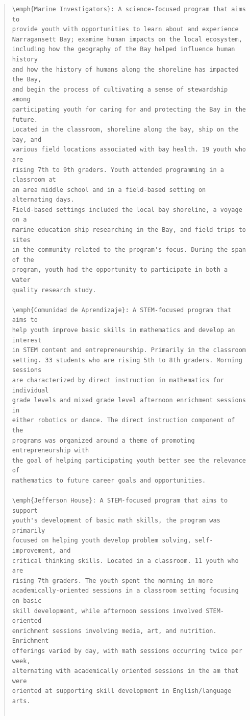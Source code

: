 \documentclass[]{msu-thesis}
\theoremstyle{definition}
\theoremstyle{definition}
\theoremstyle{definition}
\theoremstyle{remark}
\begin{document}
\begin{quote}
\begin{lstlisting}
\emph{Marine Investigators}: A science-focused program that aims to
provide youth with opportunities to learn about and experience
Narragansett Bay; examine human impacts on the local ecosystem,
including how the geography of the Bay helped influence human history
and how the history of humans along the shoreline has impacted the Bay,
and begin the process of cultivating a sense of stewardship among
participating youth for caring for and protecting the Bay in the future.
Located in the classroom, shoreline along the bay, ship on the bay, and
various field locations associated with bay health. 19 youth who are
rising 7th to 9th graders. Youth attended programming in a classroom at
an area middle school and in a field-based setting on alternating days.
Field-based settings included the local bay shoreline, a voyage on a
marine education ship researching in the Bay, and field trips to sites
in the community related to the program's focus. During the span of the
program, youth had the opportunity to participate in both a water
quality research study.

\emph{Comunidad de Aprendizaje}: A STEM-focused program that aims to
help youth improve basic skills in mathematics and develop an interest
in STEM content and entrepreneurship. Primarily in the classroom
setting. 33 students who are rising 5th to 8th graders. Morning sessions
are characterized by direct instruction in mathematics for individual
grade levels and mixed grade level afternoon enrichment sessions in
either robotics or dance. The direct instruction component of the
programs was organized around a theme of promoting entrepreneurship with
the goal of helping participating youth better see the relevance of
mathematics to future career goals and opportunities.

\emph{Jefferson House}: A STEM-focused program that aims to support
youth's development of basic math skills, the program was primarily
focused on helping youth develop problem solving, self-improvement, and
critical thinking skills. Located in a classroom. 11 youth who are
rising 7th graders. The youth spent the morning in more
academically-oriented sessions in a classroom setting focusing on basic
skill development, while afternoon sessions involved STEM-oriented
enrichment sessions involving media, art, and nutrition. Enrichment
offerings varied by day, with math sessions occurring twice per week,
alternating with academically oriented sessions in the am that were
oriented at supporting skill development in English/language arts.


\end{lstlisting}
\end{quote}
\end{document}
